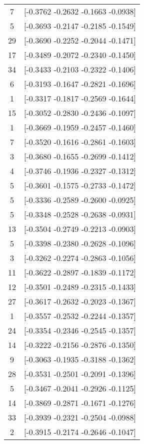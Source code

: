 \documentclass[12pt, fullpage,letterpaper]{article}
\begin{document}
\begin{enumerate}
\begin{enumerate}
{\begin{longtable}{|c|c|}
			  7 &  [-0.3762 -0.2632 -0.1663 -0.0938] \\
			  5 &  [-0.3693 -0.2147 -0.2185 -0.1549] \\
			 29 &  [-0.3690 -0.2252 -0.2044 -0.1471] \\
			 17 &  [-0.3489 -0.2072 -0.2340 -0.1450] \\
			 34 &  [-0.3433 -0.2103 -0.2322 -0.1406] \\
			  6 &  [-0.3193 -0.1647 -0.2821 -0.1696] \\
			  1 &  [-0.3317 -0.1817 -0.2569 -0.1644] \\
			 15 &  [-0.3052 -0.2830 -0.2436 -0.1097] \\
			  1 &  [-0.3669 -0.1959 -0.2457 -0.1460] \\
			  7 &  [-0.3520 -0.1616 -0.2861 -0.1603] \\
			  3 &  [-0.3680 -0.1655 -0.2699 -0.1412] \\
			  4 &  [-0.3746 -0.1936 -0.2327 -0.1312] \\
			  5 &  [-0.3601 -0.1575 -0.2733 -0.1472] \\
			  5 &  [-0.3336 -0.2589 -0.2600 -0.0925] \\
			  5 &  [-0.3348 -0.2528 -0.2638 -0.0931] \\
			 13 &  [-0.3504 -0.2749 -0.2213 -0.0903] \\
			  5 &  [-0.3398 -0.2380 -0.2628 -0.1096] \\
			  3 &  [-0.3262 -0.2274 -0.2863 -0.1056] \\
			 11 &  [-0.3622 -0.2897 -0.1839 -0.1172] \\
			 12 &  [-0.3501 -0.2489 -0.2315 -0.1433] \\
			 27 &  [-0.3617 -0.2632 -0.2023 -0.1367] \\
			  1 &  [-0.3557 -0.2532 -0.2244 -0.1357] \\
			 24 &  [-0.3354 -0.2346 -0.2545 -0.1357] \\
			 14 &  [-0.3222 -0.2156 -0.2876 -0.1350] \\
			  9 &  [-0.3063 -0.1935 -0.3188 -0.1362] \\
			 28 &  [-0.3531 -0.2501 -0.2091 -0.1396] \\
			  5 &  [-0.3467 -0.2041 -0.2926 -0.1125] \\
			 14 &  [-0.3869 -0.2871 -0.1671 -0.1276] \\
			 33 &  [-0.3939 -0.2321 -0.2504 -0.0988] \\
			  2 &  [-0.3915 -0.2174 -0.2646 -0.1047] \\

\end{longtable}}
\end{enumerate}
\end{enumerate}
\end{document}
